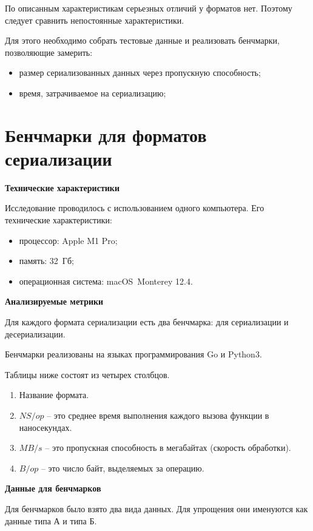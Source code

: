 По описанным характеристикам серьезных отличий у форматов нет.
Поэтому следует сравнить непостоянные характеристики.  

Для этого необходимо собрать тестовые данные и реализовать бенчмарки, позволяющие замерить:
\begin{itemize}
\item размер сериализованных данных через пропускную способность;
\item время, затрачиваемое на сериализацию;
\end{itemize}

\clearpage



\section{Бенчмарки для форматов сериализации}

\textbf{Технические характеристики}

Исследование проводилось с использованием одного компьютера.
Его технические характеристики:
\begin{itemize}
	\item процессор: Apple M1 Pro;
	\item память: 32~Гб;
	\item операционная система: macOS~Monterey \cite{monterey} 12.4.
\end{itemize}

\textbf{Анализируемые метрики}

Для каждого формата сериализации есть два бенчмарка: для сериализации и десериализации.

Бенчмарки реализованы на языках программирования Go и Python3.  

Таблицы ниже состоят из четырех столбцов.
\begin{enumerate}
\item Название формата.
\item $NS/op$ -- это среднее время выполнения каждого вызова функции в наносекундах.
\item $MB/s$ -- это пропускная способность в мегабайтах (скорость обработки).
\item $B/op$ -- это число байт, выделяемых за операцию.
\end{enumerate}

\textbf{Данные для бенчмарков}

Для бенчмарков было взято два вида данных. Для упрощения они именуются как данные типа А и типа Б.

